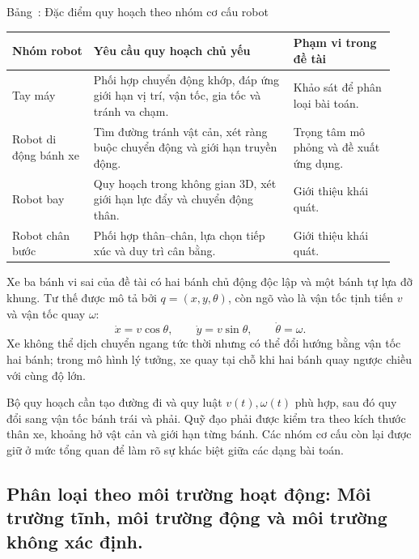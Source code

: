 \documentclass[12pt,a4paper,oneside]{report}
\renewcommand{\tablename}{Bảng}
\begin{document}
\begin{center}
\begin{minipage}{\linewidth}
  \centering
  \label{tab:robot-planning-comparison}%
  \tablename~\thetable: Đặc điểm quy hoạch theo nhóm cơ cấu robot\par\smallskip
  \small
  \renewcommand{\arraystretch}{1.3}
  \begin{tabular}{@{}p{0.20\linewidth}p{0.49\linewidth}p{0.25\linewidth}@{}}
    \toprule
    \textbf{Nhóm robot} & \textbf{Yêu cầu quy hoạch chủ yếu} & \textbf{Phạm vi trong đề tài}\\
    \midrule
    Tay máy & Phối hợp chuyển động khớp, đáp ứng giới hạn vị trí, vận tốc, gia tốc và tránh va chạm. & Khảo sát để phân loại bài toán.\\
    Robot di động bánh xe & Tìm đường tránh vật cản, xét ràng buộc chuyển động và giới hạn truyền động. & Trọng tâm mô phỏng và đề xuất ứng dụng.\\
    Robot bay & Quy hoạch trong không gian 3D, xét giới hạn lực đẩy và chuyển động thân. & Giới thiệu khái quát.\\
    Robot chân bước & Phối hợp thân--chân, lựa chọn tiếp xúc và duy trì cân bằng. & Giới thiệu khái quát.\\
    \bottomrule
  \end{tabular}
\end{minipage}
\end{center}

Xe ba bánh vi sai của đề tài có hai bánh chủ động độc lập và một bánh tự lựa đỡ khung. Tư thế được mô tả bởi \(q=(x,y,\theta)\), còn ngõ vào là vận tốc tịnh tiến \(v\) và vận tốc quay \(\omega\):
\[
  \dot x=v\cos\theta,\qquad
  \dot y=v\sin\theta,\qquad \dot\theta=\omega.
\]
Xe không thể dịch chuyển ngang tức thời nhưng có thể đổi hướng bằng vận tốc hai bánh; trong mô hình lý tưởng, xe quay tại chỗ khi hai bánh quay ngược chiều với cùng độ lớn.

Bộ quy hoạch cần tạo đường đi và quy luật \(v(t),\omega(t)\) phù hợp, sau đó quy đổi sang vận tốc bánh trái và phải. Quỹ đạo phải được kiểm tra theo kích thước thân xe, khoảng hở vật cản và giới hạn từng bánh. Các nhóm cơ cấu còn lại được giữ ở mức tổng quan để làm rõ sự khác biệt giữa các dạng bài toán.

\subsection{Phân loại theo môi trường hoạt động: Môi trường tĩnh, môi trường động và môi trường không xác định.}
\end{document}
